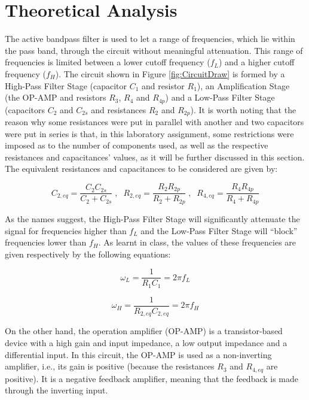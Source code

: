 \section{Theoretical Analysis} \label{sec:analysis}

The active bandpass filter is used to let a range of frequencies, which lie within the pass band, through the circuit without meaningful attenuation. This range of frequencies is limited between a lower cutoff frequency ($f_L$) and a higher cutoff frequency ($f_H$). The circuit shown in Figure \ref{fig:CircuitDraw} is formed by a High-Pass Filter Stage (capacitor $C_1$ and resistor $R_1$), an Amplification Stage (the OP-AMP and resistors $R_3$, $R_4$ and $R_{4p}$) and a Low-Pass Filter Stage (capacitors $C_2$ and $C_{2s}$ and resistances $R_2$ and $R_{2p}$). It is worth noting that the reason why some resistances were put in parallel with another and two capacitors were put in series is that, in this laboratory assignment, some restrictions were imposed as to the number of components used, as well as the respective resistances and capacitances' values, as it will be further discussed in this section. The equivalent resistances and capacitances to be considered are given by:

\begin{equation}\label{eq:equivalent_resistances_capacitances}
  C_{2,eq}=\frac{C_2C_{2s}}{C_2+C_{2s}}\;,\;\;R_{2,eq}=\frac{R_2R_{2p}}{R_2+R_{2p}}\;,\;\;R_{4,eq}=\frac{R_4R_{4p}}{R_4+R_{4p}}
\end{equation}

As the names suggest, the High-Pass Filter Stage will significantly attenuate the signal for frequencies higher than $f_L$ and the Low-Pass Filter Stage will ``block'' frequencies lower than $f_H$. As learnt in class, the values of these frequencies are given respectively by the following equations:

\begin{equation}\label{eq:lower_cutoff_frequency}
  \omega_L=\frac{1}{R_1C_1}=2\pi f_L
\end{equation}

\begin{equation}\label{eq:higher_cutoff_frequency}
  \omega_H=\frac{1}{R_{2,eq}C_{2,eq}}=2\pi f_H
\end{equation}

On the other hand, the operation amplifier (OP-AMP) is a transistor-based device with a high gain and input impedance, a low output impedance and a differential input. In this circuit, the OP-AMP is used as a non-inverting amplifier, i.e., its gain is positive (because the resistances $R_3$ and $R_{4,eq}$ are positive). It is a negative feedback amplifier, meaning that the feedback is made through the inverting input.

